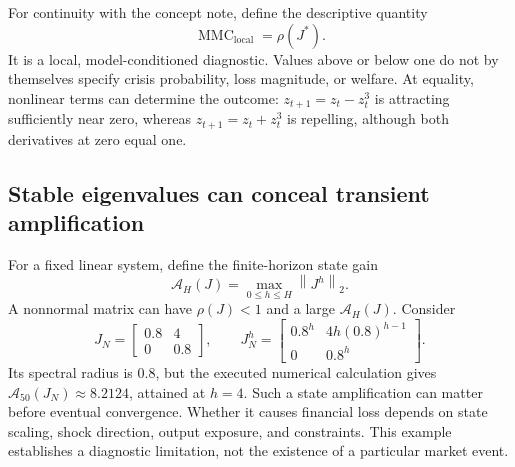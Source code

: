 \documentclass[11pt,a4paper]{article}
\theoremstyle{definition}
\theoremstyle{remark}
\newcommand{\norm}[1]{\left\lVert #1\right\rVert}
\newcommand{\MMC}{\operatorname{MMC}}
\begin{document}
For continuity with the concept note, define the descriptive quantity
\begin{equation}
 \MMC_{\mathrm{local}}=\rho(J^*).
 \label{eq:mmc}
\end{equation}
It is a local, model-conditioned diagnostic. Values above or below one do not by themselves specify crisis probability, loss magnitude, or welfare. At equality, nonlinear terms can determine the outcome: $z_{t+1}=z_t-z_t^3$ is attracting sufficiently near zero, whereas $z_{t+1}=z_t+z_t^3$ is repelling, although both derivatives at zero equal one.

\subsection{Stable eigenvalues can conceal transient amplification}
For a fixed linear system, define the finite-horizon state gain
\begin{equation}
 \mathcal A_H(J)=\max_{0\leq h\leq H}\norm{J^h}_2.
 \label{eq:gain}
\end{equation}
A nonnormal matrix can have $\rho(J)<1$ and a large $\mathcal A_H(J)$. Consider
\begin{equation}
 J_N=\begin{bmatrix}0.8&4\\0&0.8\end{bmatrix},\qquad
 J_N^h=\begin{bmatrix}0.8^h&4h(0.8)^{h-1}\\0&0.8^h\end{bmatrix}.
 \label{eq:nonnormal}
\end{equation}
Its spectral radius is $0.8$, but the executed numerical calculation gives $\mathcal A_{50}(J_N)\approx8.2124$, attained at $h=4$. Such a state amplification can matter before eventual convergence. Whether it causes financial loss depends on state scaling, shock direction, output exposure, and constraints. This example establishes a diagnostic limitation, not the existence of a particular market event.
\end{document}
